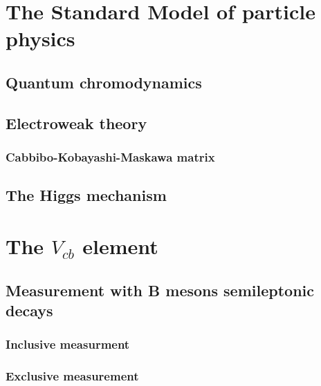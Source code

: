 \label{sec:TH}
\minitoc


\section{The Standard Model of particle physics}

\subsection{Quantum chromodynamics}

\subsection{Electroweak theory}

\subsubsection*{Cabbibo-Kobayashi-Maskawa matrix}

\subsection{The Higgs mechanism}

\section{The $V_{cb}$ element}

\subsection{Measurement with B mesons semileptonic decays}

\subsubsection*{Inclusive measurment}

\subsubsection*{Exclusive measurement}

